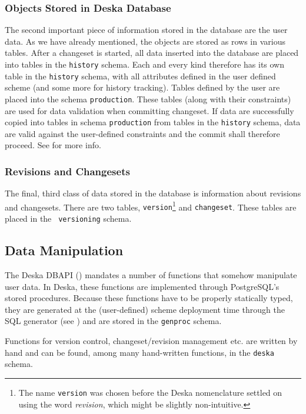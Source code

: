\documentclass[deska]{subfiles}
\begin{document}
\subsubsection{Objects Stored in Deska Database}

The second important piece of information stored in the database are the user data.  As we have already mentioned, the
objects are stored as rows in various tables.  After a changeset is started, all data inserted into the database are
placed into tables in the {\tt history} schema. Each and every kind therefore has its own table in the {\tt history}
schema, with all attributes defined in the user defined scheme (and some more for history tracking).  Tables defined by
the user are placed into the schema {\tt production}. These tables (along with their constraints) are used for data
validation when committing changeset. If data are successfully copied into tables in schema {\tt production} from tables
in the {\tt history} schema, data are valid against the user-defined constraints and the commit shall therefore proceed.
See  for more info.

\subsubsection{Revisions and Changesets}
The final, third class of data stored in the database is information about revisions and changesets. There are two
tables, {\tt version}\footnote{The name {\tt version} was chosen before the Deska nomenclature settled on using the word
{\em revision}, which might be slightly non-intuitive.} and {\tt changeset}. These tables are placed in the {\tt
versioning} schema.

\subsection{Data Manipulation}

The Deska DBAPI () mandates a number of functions that somehow manipulate user data.  In
Deska, these functions are implemented through PostgreSQL's stored procedures.  Because these functions have to be
properly statically typed, they are generated at the (user-defined) scheme deployment time through the SQL generator
(see ) and are stored in the {\tt genproc} schema.

Functions for version control, changeset/revision management etc. are written by hand and can be found, among many
hand-written functions, in the {\tt deska} schema.
\end{document}
